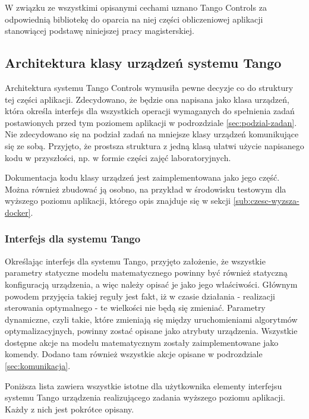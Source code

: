 W związku ze wszystkimi opisanymi cechami uznano Tango Controls za odpowiednią bibliotekę do oparcia na niej części obliczeniowej aplikacji stanowiącej podstawę niniejszej pracy magisterskiej.


\subsection{Architektura klasy urządzeń systemu Tango}
\label{sub:czesc-wyzsza-klasa}

Architektura systemu Tango Controls wymusiła pewne decyzje co do struktury tej części aplikacji. Zdecydowano, że będzie ona napisana jako klasa urządzeń, która określa interfejs dla wszystkich operacji wymaganych do spełnienia zadań postawionych przed tym poziomem aplikacji w podrozdziale \ref{sec:podzial-zadan}. Nie zdecydowano się na podział zadań na mniejsze klasy urządzeń komunikujące się ze sobą. Przyjęto, że prostsza struktura z jedną klasą ułatwi użycie napisanego kodu w przyszłości, np. w formie części zajęć laboratoryjnych.

Dokumentacja kodu klasy urządzeń jest zaimplementowana jako jego część. Można również zbudować ją osobno, na przykład w środowisku testowym dla wyższego poziomu aplikacji, którego opis znajduje się w sekcji \ref{sub:czesc-wyzsza-docker}.

\subsubsection{Interfejs dla systemu Tango}

Określając interfejs dla systemu Tango, przyjęto założenie, że wszystkie parametry statyczne modelu matematycznego powinny być również statyczną konfiguracją urządzenia, a więc należy opisać je jako jego właściwości. Głównym powodem przyjęcia takiej reguły jest fakt, iż w czasie działania - realizacji sterowania optymalnego - te wielkości nie będą się zmieniać.
Parametry dynamiczne, czyli takie, które zmieniają się między uruchomieniami algorytmów optymalizacyjnych, powinny zostać opisane jako atrybuty urządzenia.
Wszystkie dostępne akcje na modelu matematycznym zostały zaimplementowane jako komendy. Dodano tam również wszystkie akcje opisane w podrozdziale \ref{sec:komunikacja}.

Poniższa lista zawiera wszystkie istotne dla użytkownika elementy interfejsu systemu Tango urządzenia realizującego zadania wyższego poziomu aplikacji. Każdy z nich jest pokrótce opisany.

